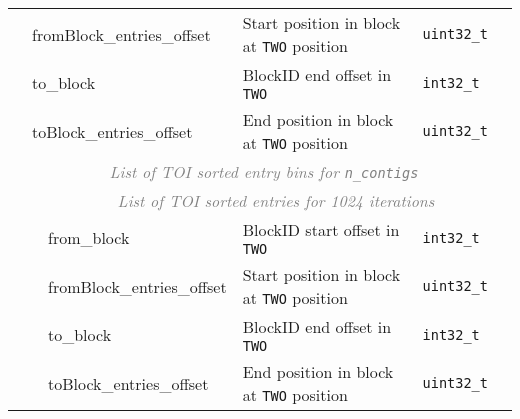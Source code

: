 \documentclass[10pt]{article}
\begin{document}
\begin{table}[H]
{\begin{tabular}{|l|l|l|l|l|l|r|}
  & \multicolumn{3}{|l|}{\sf fromBlock\_entries\_offset} & Start position in block at {\tt TWO} position & {\tt uint32\_t} & \\\cline{2-7}
  & \multicolumn{3}{|l|}{\sf to\_block} & BlockID end offset in {\tt TWO} & {\tt int32\_t} & \\\cline{2-7}
  & \multicolumn{3}{|l|}{\sf toBlock\_entries\_offset} & End position in block at {\tt TWO} position & {\tt uint32\_t} & \\\cline{2-7}
  & \multicolumn{6}{c|}{\textcolor{gray}{\it List of TOI sorted entry bins for {\tt n\_contigs } }} \\\cline{3-7}
  & & \multicolumn{5}{c|}{\textcolor{gray}{\it List of TOI sorted entries for 1024 iterations}} \\\cline{3-7}
  & & \multicolumn{2}{l|}{\sf from\_block} & BlockID start offset in {\tt TWO} & {\tt int32\_t} & \\\cline{3-7}
  & & \multicolumn{2}{l|}{\sf fromBlock\_entries\_offset} & Start position in block at {\tt TWO} position & {\tt uint32\_t} & \\\cline{3-7}
  & & \multicolumn{2}{l|}{\sf to\_block} & BlockID end offset in {\tt TWO} & {\tt int32\_t} & \\\cline{3-7}
  & & \multicolumn{2}{l|}{\sf toBlock\_entries\_offset} & End position in block at {\tt TWO} position & {\tt uint32\_t} & \\\cline{3-7}

  \hline

\end{tabular}}
\end{table}
\end{document}
